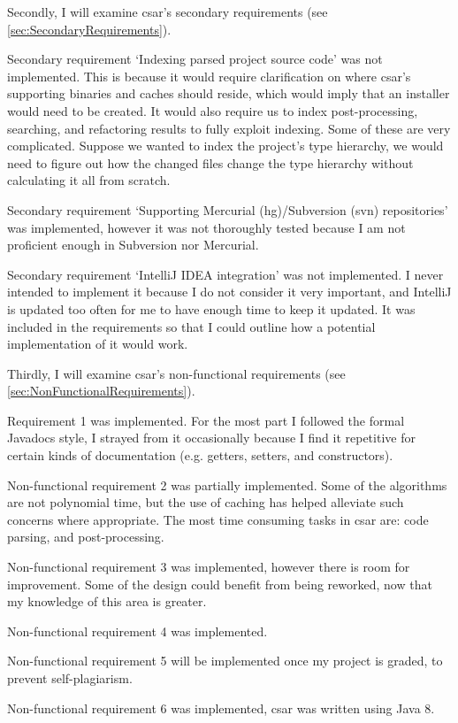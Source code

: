 \documentclass[12pt, letterpaper]{article}
\begin{document}
Secondly, I will examine csar's secondary requirements (see \ref{sec:SecondaryRequirements}).

Secondary requirement `Indexing parsed project source code' was not implemented.
This is because it would require clarification on where csar's supporting binaries and caches should reside, which would imply that an installer would need to be created.
It would also require us to index post-processing, searching, and refactoring results to fully exploit indexing.
Some of these are very complicated.
Suppose we wanted to index the project's type hierarchy, we would need to figure out how the changed files change the type hierarchy without calculating it all from scratch.

Secondary requirement `Supporting Mercurial (hg)/Subversion (svn) repositories' was implemented, however it was not thoroughly tested because I am not proficient enough in Subversion nor Mercurial.

Secondary requirement `IntelliJ IDEA integration' was not implemented.
I never intended to implement it because I do not consider it very important, and IntelliJ is updated too often for me to have enough time to keep it updated.
It was included in the requirements so that I could outline how a potential implementation of it would work.

Thirdly, I will examine csar's non-functional requirements (see \ref{sec:NonFunctionalRequirements}).

Requirement 1 was implemented.
For the most part I followed the formal Javadocs style, I strayed from it occasionally because I find it repetitive for certain kinds of documentation (e.g. getters, setters, and constructors).

Non-functional requirement 2 was partially implemented.
Some of the algorithms are not polynomial time, but the use of caching has helped alleviate such concerns where appropriate.
The most time consuming tasks in csar are: code parsing, and post-processing.

Non-functional requirement 3 was implemented, however there is room for improvement.
Some of the design could benefit from being reworked, now that my knowledge of this area is greater.

Non-functional requirement 4 was implemented.

Non-functional requirement 5 will be implemented once my project is graded, to prevent self-plagiarism.

Non-functional requirement 6 was implemented, csar was written using Java 8.
\end{document}
